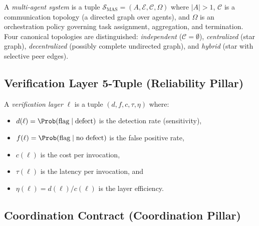 \begin{definition}
\label{def:ext-mas}
A \emph{multi-agent system} is a tuple
$\mathcal{S}_{\text{MAS}} = (A, \mathcal{E}, \mathcal{C}, \Omega)$
where $|A| > 1$, $\mathcal{C}$ is a communication topology
(a directed graph over agents), and $\Omega$ is an orchestration policy
governing task assignment, aggregation, and termination.
Four canonical topologies are distinguished:
\emph{independent} ($\mathcal{C} = \emptyset$),
\emph{centralized} (star graph),
\emph{decentralized} (possibly complete undirected graph), and
\emph{hybrid} (star with selective peer edges).
\end{definition}


\subsection{Verification Layer 5-Tuple (Reliability Pillar)}

\begin{definition}
\label{def:ext-vlayer}
A \emph{verification layer} $\ell$ is a tuple $(d, f, c, \tau, \eta)$ where:
\begin{itemize}[nosep]
  \item $d(\ell) = \Prob(\text{flag} \mid \text{defect})$ is the detection rate (sensitivity),
  \item $f(\ell) = \Prob(\text{flag} \mid \text{no defect})$ is the false positive rate,
  \item $c(\ell)$ is the cost per invocation,
  \item $\tau(\ell)$ is the latency per invocation, and
  \item $\eta(\ell) = d(\ell) / c(\ell)$ is the layer efficiency.
\end{itemize}
\end{definition}


\subsection{Coordination Contract (Coordination Pillar)}

